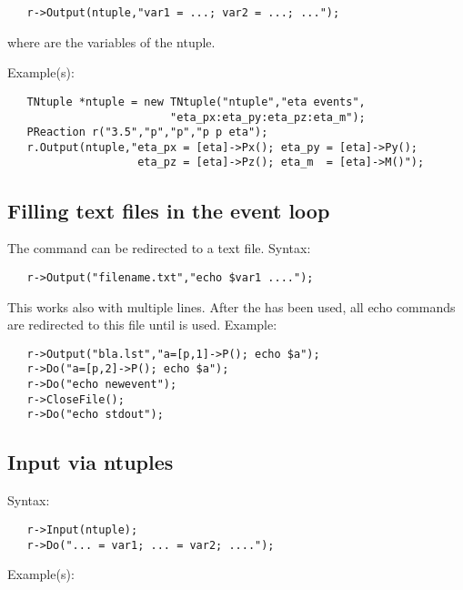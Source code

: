 {\begin{verbatim}
   r->Output(ntuple,"var1 = ...; var2 = ...; ...");
\end{verbatim}

where  are the variables of the ntuple.

Example(s):

\begin{verbatim}
   TNtuple *ntuple = new TNtuple("ntuple","eta events",
                         "eta_px:eta_py:eta_pz:eta_m");
   PReaction r("3.5","p","p","p p eta");
   r.Output(ntuple,"eta_px = [eta]->Px(); eta_py = [eta]->Py(); 
                    eta_pz = [eta]->Pz(); eta_m  = [eta]->M()");
\end{verbatim}

\subsection{Filling text files in the event loop}

The  command can be redirected to a text file. Syntax:

\begin{verbatim}
   r->Output("filename.txt","echo $var1 ....");
\end{verbatim}

This works also with multiple lines. After the  has
been used, all echo commands are redirected to this file until 
is used.
Example:

\begin{verbatim}
   r->Output("bla.lst","a=[p,1]->P(); echo $a");
   r->Do("a=[p,2]->P(); echo $a");
   r->Do("echo newevent");
   r->CloseFile();
   r->Do("echo stdout");
\end{verbatim}

\subsection{Input via ntuples}


Syntax:

\begin{verbatim}
   r->Input(ntuple);
   r->Do("... = var1; ... = var2; ....");
\end{verbatim}


Example(s):

}
